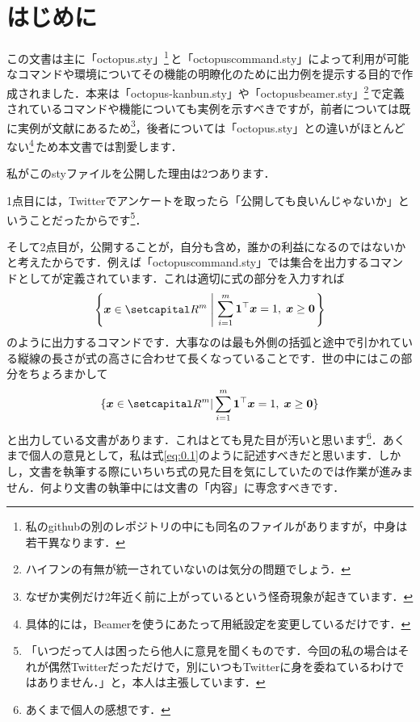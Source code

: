 \documentclass[uplatex]{jsreport}
\begin{document}
\section*{はじめに}
この文書は主に「octopus.sty」\footnote{私のgithubの別のレポジトリの中にも同名のファイルがありますが，中身は若干異なります．}\,と「octopuscommand.sty」によって利用が可能なコマンドや環境についてその機能の明瞭化のために出力例を提示する目的で作成されました．本来は「octopus-kanbun.sty」や「octopusbeamer.sty」\footnote{ハイフンの有無が統一されていないのは気分の問題でしょう．}\,で定義されているコマンドや機能についても実例を示すべきですが，前者については既に実例が文献\cite{oct-kanbun}にあるため\footnote{なぜか実例だけ2年近く前に上がっているという怪奇現象が起きています．}，後者については「octopus.sty」との違いがほとんどない\footnote{具体的には，Beamerを使うにあたって用紙設定を変更しているだけです．}\,ため本文書では割愛します．\par
\sukima
私がこのstyファイルを公開した理由は2つあります．\par
1点目には，Twitterでアンケートを取ったら「公開しても良いんじゃないか」ということだったからです\footnote{「いつだって人は困ったら他人に意見を聞くものです．今回の私の場合はそれが偶然Twitterだっただけで，別にいつもTwitterに身を委ねているわけではありません．」と，本人は主張しています．}．\par
そして2点目が，公開することが，自分も含め，誰かの利益になるのではないかと考えたからです．例えば「octopuscommand.sty」では集合を出力するコマンドとしてが定義されています．これは適切に式の部分を入力すれば
\begin{align}\label{eq:0.1}
  \set{\bm{x} \in \setR^{m}}[%
    {\displaystyle \sum_{i=1}^{m} \bm{1}^{\top} \bm{x} = 1, \; \bm{x} \ge \bm{0}}%
  ]%
\end{align}
のように出力するコマンドです．大事なのは最も外側の括弧と途中で引かれている縦線の長さが式の高さに合わせて長くなっていることです．世の中にはこの部分をちょろまかして
\begin{align}
  \{ \bm{x} \in \setR^{m} | \sum_{i=1}^{m} \bm{1}^{\top} \bm{x} = 1, \; \bm{x} \ge \bm{0} \}
\end{align}
と出力している文書があります．これはとても見た目が汚いと思います\footnote{あくまで個人の感想です．}．あくまで個人の意見として，私は式\eqref{eq:0.1}のように記述すべきだと思います．しかし，文書を執筆する際にいちいち式の見た目を気にしていたのでは作業が進みません．何より文書の執筆中には文書の「内容」に専念すべきです．\par
\end{document}
